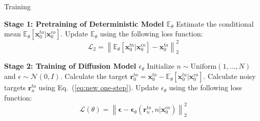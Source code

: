 




\begin{algorithm}[t]
    \caption{Training}
    \label{al: train}
    \begin{algorithmic}[1]
        \State \textbf{Stage 1: Pretraining of Deterministic Model $\mathbb{E}_{\theta}$}
        \Repeat
            \State Estimate the conditional mean \(\mathbb{E}_{\theta}[\mathbf{x}^{ta}_0|\mathbf{x}^{co}_0]\).
            \State Update $\mathbb{E}_{\theta}$ using the following loss function:
            \[
            \mathcal{L}_{2} = \left\lVert \mathbb{E}_{\theta}[\mathbf{x}^{ta}_0|\mathbf{x}^{co}_0] - \mathbf{x}^{ta}_0 \right\rVert_2^2
            \]

        \State \textbf{Stage 2: Training of Diffusion Model $\epsilon_{\theta}$}
        \Repeat
            \State Initialize \(n \sim \text{Uniform}(1, \dots, N)\) and \(\epsilon \sim \mathcal{N}(0, I)\).
            \State Calculate the target \(\mathbf{r}_0^{ta}=\mathbf{x}_0^{ta}-\mathbb{E}_{\theta}[\mathbf{x}^{ta}_0|\mathbf{x}^{co}_0]\).
            \State Calculate noisy targets \(\mathbf{r}_n^{ta}\) using Eq.~(\ref{eq:new one-step}).
            \State Update $\epsilon_{\theta}$ using the following loss function:
            \[
            \mathcal{L}(\theta)=\left\lVert \mathbf{\epsilon} - \mathbf{\epsilon}_{\theta}(\mathbf{r}_n^{ta}, n| \mathbf{x}_0^{co}) \right\rVert_2^2 
            \]
    \end{algorithmic}
\end{algorithm}